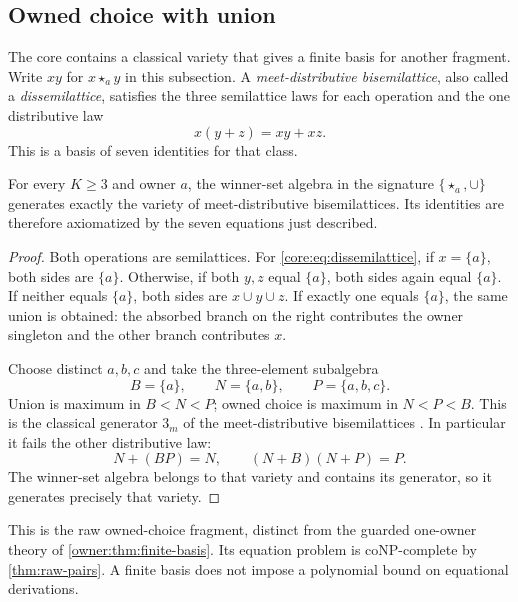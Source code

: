 \subsection{Owned choice with union}
\label{app:core-dissemilattice}

The core contains a classical variety that gives a finite basis for
another fragment.
Write $xy$ for $x\star_a y$ in this subsection.
A \emph{meet-distributive bisemilattice}, also called a
\emph{dissemilattice}, satisfies the three semilattice laws for each
operation and the one distributive law
\begin{equation}\label{core:eq:dissemilattice}
 x(y+z)=xy+xz.
\end{equation}
This is a basis of seven identities for that class.

\begin{proposition}\label{core:prop:choice-union-basis}
For every $K\geq3$ and owner $a$, the winner-set algebra in the
signature $\{\star_a,\cup\}$ generates exactly the variety of
meet-distributive bisemilattices. Its identities are therefore
axiomatized by the seven equations just described.
\end{proposition}
\begin{proof}
Both operations are semilattices. For
\eqref{core:eq:dissemilattice}, if $x=\{a\}$, both sides are
$\{a\}$. Otherwise, if both $y,z$ equal $\{a\}$, both sides
again equal $\{a\}$. If neither equals $\{a\}$, both sides are
$x\cup y\cup z$. If exactly one equals $\{a\}$, the same union
is obtained: the absorbed branch on the right contributes the
owner singleton and the other branch contributes $x$.

Choose distinct $a,b,c$ and take the three-element subalgebra
\[
 B=\{a\},\qquad N=\{a,b\},\qquad P=\{a,b,c\}.
\]
Union is maximum in $B<N<P$; owned choice is maximum in
$N<P<B$. This is the classical generator $3_m$ of the
meet-distributive bisemilattices
\cite[Section~3.3, Theorem~3.9 and the following paragraph]{HardingRomanowska2017}.
In particular it fails the other distributive law:
\[
 N+(BP)=N,\qquad (N+B)(N+P)=P.
\]
The winner-set algebra belongs to that variety and contains its
generator, so it generates precisely that variety.
\end{proof}

This is the raw owned-choice fragment, distinct from the guarded
one-owner theory of \cref{owner:thm:finite-basis}. Its equation
problem is coNP-complete by \cref{thm:raw-pairs}. A finite basis
does not impose a polynomial bound on equational derivations.

